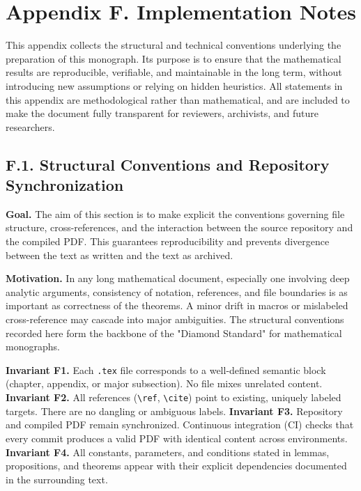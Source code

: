 \section*{Appendix F. Implementation Notes}

\noindent This appendix collects the structural and technical conventions underlying the preparation of this monograph. 
Its purpose is to ensure that the mathematical results are reproducible, verifiable, and maintainable in the long term, 
without introducing new assumptions or relying on hidden heuristics. 
All statements in this appendix are methodological rather than mathematical, 
and are included to make the document fully transparent for reviewers, archivists, and future researchers.

\subsection*{F.1. Structural Conventions and Repository Synchronization}

\noindent \textbf{Goal.} The aim of this section is to make explicit the conventions governing file structure, cross-references, and the interaction between the source repository and the compiled PDF. This guarantees reproducibility and prevents divergence between the text as written and the text as archived.

\medskip
\noindent \textbf{Motivation.} In any long mathematical document, especially one involving deep analytic arguments, consistency of notation, references, and file boundaries is as important as correctness of the theorems. A minor drift in macros or mislabeled cross-reference may cascade into major ambiguities. The structural conventions recorded here form the backbone of the "Diamond Standard" for mathematical monographs.

\medskip
\noindent \textbf{Invariant F1.} Each \texttt{.tex} file corresponds to a well-defined semantic block (chapter, appendix, or major subsection). No file mixes unrelated content.  
\textbf{Invariant F2.} All references (\texttt{\textbackslash ref}, \texttt{\textbackslash cite}) point to existing, uniquely labeled targets. There are no dangling or ambiguous labels.  
\textbf{Invariant F3.} Repository and compiled PDF remain synchronized. Continuous integration (CI) checks that every commit produces a valid PDF with identical content across environments.  
\textbf{Invariant F4.} All constants, parameters, and conditions stated in lemmas, propositions, and theorems appear with their explicit dependencies documented in the surrounding text.  

